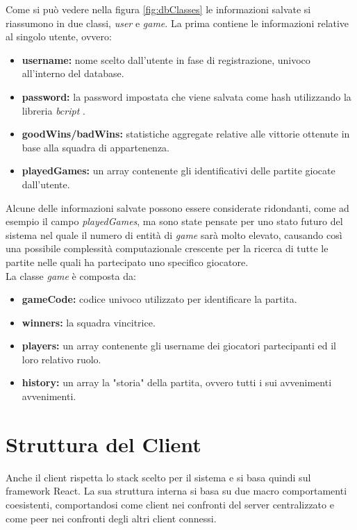 Come si può vedere nella figura \ref{fig:dbClasses} le informazioni salvate si riassumono in due classi, \emph{user} e \emph{game}. La prima contiene le informazioni relative al singolo utente, ovvero:
\begin{itemize}
    \item \textbf{username:} nome scelto dall'utente in fase di registrazione, univoco all'interno del database.
    \item \textbf{password:} la password impostata che viene salvata come hash utilizzando la libreria \emph{bcript} \cite{bcryptWikipedia}.
    \item \textbf{goodWins/badWins:} statistiche aggregate relative alle vittorie ottenute in base alla squadra di appartenenza.
    \item \textbf{playedGames:} un array contenente gli identificativi delle partite giocate dall'utente.
\end{itemize}
Alcune delle informazioni salvate possono essere considerate ridondanti, come ad esempio il campo \emph{playedGames}, ma sono state pensate per uno stato futuro del sistema nel quale il numero di entità di \emph{game} sarà molto elevato, causando così una possibile complessità computazionale crescente per la ricerca di tutte le partite nelle quali ha partecipato uno specifico giocatore.\\
La classe \emph{game} è composta da:
\begin{itemize}
    \item \textbf{gameCode:} codice univoco utilizzato per identificare la partita.
    \item \textbf{winners:} la squadra vincitrice.
    \item \textbf{players:} un array contenente gli username dei giocatori partecipanti ed il loro relativo ruolo.
    \item \textbf{history:} un array la "storia" della partita, ovvero tutti i sui avvenimenti avvenimenti.
\end{itemize}

\section{Struttura del Client}
Anche il client rispetta lo stack scelto per il sistema e si basa quindi sul framework React. La sua struttura interna si basa su due macro comportamenti coesistenti, comportandosi come client nei confronti del server centralizzato e come peer nei confronti degli altri client connessi.\\

